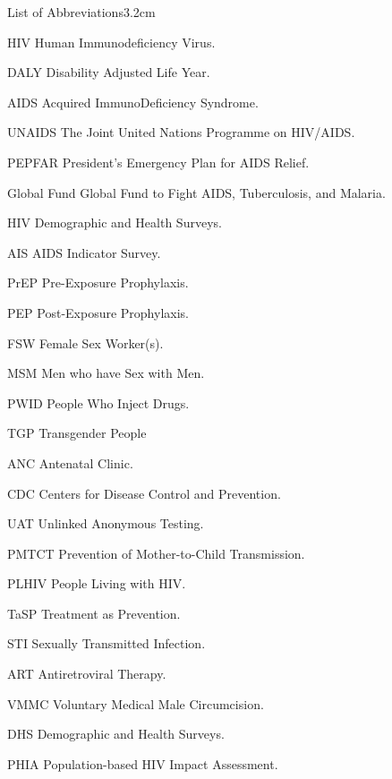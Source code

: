

\begin{mclistof}{List of Abbreviations}{3.2cm}

\item[HIV] Human Immunodeficiency Virus.
\item[DALY] Disability Adjusted Life Year.
\item[AIDS] Acquired ImmunoDeficiency Syndrome.
\item[UNAIDS] The Joint United Nations Programme on HIV/AIDS.
\item[PEPFAR] President’s Emergency Plan for AIDS Relief.
\item[Global Fund] Global Fund to Fight AIDS, Tuberculosis, and Malaria.
\item[HIV] Demographic and Health Surveys.
\item[AIS] AIDS Indicator Survey.
\item[PrEP] Pre-Exposure Prophylaxis.
\item[PEP] Post-Exposure Prophylaxis.
\item[FSW] Female Sex Worker(s).
\item[MSM] Men who have Sex with Men.
\item[PWID] People Who Inject Drugs.
\item[TGP] Transgender People
\item[ANC] Antenatal Clinic.
\item[CDC] Centers for Disease Control and Prevention.
\item[UAT] Unlinked Anonymous Testing.
\item[PMTCT] Prevention of Mother-to-Child Transmission.
\item[PLHIV] People Living with HIV.
\item[TaSP] Treatment as Prevention.
\item[STI] Sexually Transmitted Infection.
\item[ART] Antiretroviral Therapy.
\item[VMMC] Voluntary Medical Male Circumcision.
\item[DHS] Demographic and Health Surveys.
\item[PHIA] Population-based HIV Impact Assessment.


\end{mclistof}
